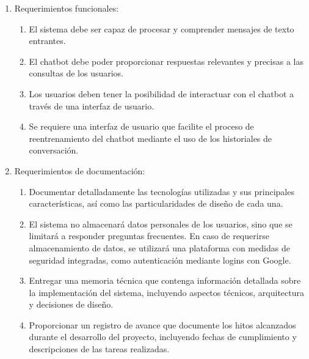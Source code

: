 \begin{enumerate}
    \item Requerimientos funcionales:
        \begin{enumerate}
            \item El sistema debe ser capaz de procesar y comprender mensajes de texto entrantes.
            \item El chatbot debe poder proporcionar respuestas relevantes y precisas a las consultas de los usuarios.
            \item Los usuarios deben tener la posibilidad de interactuar con el chatbot a través de una interfaz de usuario.
            \item Se requiere una interfaz de usuario que facilite el proceso de reentrenamiento del chatbot mediante el uso de los historiales de conversación.
        \end{enumerate}
    \item Requerimientos de documentación:
        \begin{enumerate}
            \item Documentar detalladamente las tecnologías utilizadas y sus principales características, así como las particularidades de diseño de cada una.
            \item El sistema no almacenará datos personales de los usuarios, sino que se limitará a responder preguntas frecuentes. En caso de requerirse almacenamiento de datos, se utilizará una plataforma con medidas de seguridad integradas, como autenticación mediante logins con Google.
            \item Entregar una memoria técnica que contenga información detallada sobre la implementación del sistema, incluyendo aspectos técnicos, arquitectura y decisiones de diseño.
            \item Proporcionar un registro de avance que documente los hitos alcanzados durante el desarrollo del proyecto, incluyendo fechas de cumplimiento y descripciones de las tareas realizadas.
         \end{enumerate}
		 

\end{enumerate}
